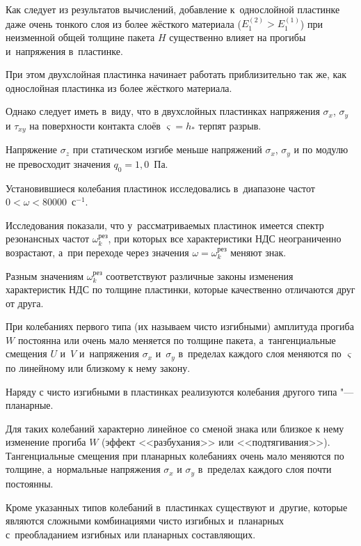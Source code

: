 




Как следует из результатов вычислений, добавление к~однослойной пластинке даже очень тонкого слоя из более жёсткого материала ($E_{1}^{(2)}>E_{1}^{(1)}$) при неизменной общей толщине пакета $H$ существенно влияет на прогибы и~напряжения в~пластинке. 

При этом двухслойная пластинка начинает работать приблизительно так же, как однослойная пластинка из более жёсткого материала. 

Однако следует иметь в~виду, что в двухслойных пластинках напряжения $\sigma_x$, $\sigma_y$ и $\tau_{xy}$ на поверхности контакта слоёв $\varsigma=h_*$ терпят разрыв.

Напряжение $\sigma_z$ при статическом изгибе меньше напряжений $\sigma_x$, $\sigma_y$ и по модулю не превосходит значения $q_0=1,0$~Па.



Установившиеся колебания пластинок исследовались в~диапазоне частот $0<\omega<80000$~с$^{-1}$. 

Исследования показали, что у~рассматриваемых пластинок имеется спектр резонансных частот $\omega_k^{\textrm{рез}}$, при которых все характеристики НДС неограниченно возрастают, а~при переходе через значения $\omega=\omega_k^{\textrm{рез}}$ меняют знак. 

Разным значениям $\omega_k^{\textrm{рез}}$ соответствуют различные законы изменения характеристик НДС по толщине пластинки, которые качественно отличаются друг от друга. 

При колебаниях первого типа (их называем чисто изгибными) амплитуда прогиба $W$ постоянна или очень мало меняется по толщине пакета, а~тангенциальные смещения $U$ и~$V$ и~напряжения $\sigma_x$ и~$\sigma_y$ в~пределах каждого слоя меняются по $\varsigma$ по линейному или близкому к нему закону.



Наряду с чисто изгибными в пластинках реализуются колебания другого типа "--- планарные. 

Для таких колебаний характерно линейное со сменой знака или близкое к нему изменение прогиба $W$ (эффект <<разбухания>> или <<подтягивания>>). Тангенциальные смещения при планарных колебаниях очень мало меняются по толщине, а~нормальные напряжения $\sigma_x$ и $\sigma_y$ в~пределах каждого слоя почти постоянны.



Кроме указанных типов колебаний в~пластинках существуют и~другие, которые являются сложными комбинациями чисто изгибных и~планарных с~преобладанием изгибных или планарных составляющих. 

